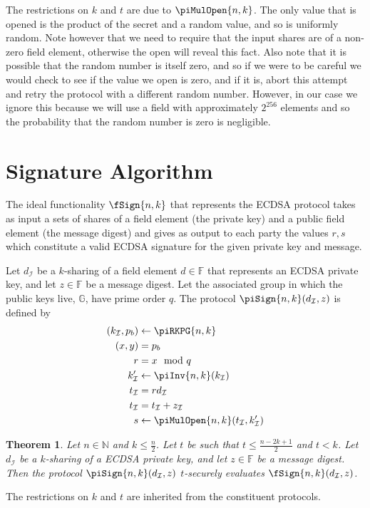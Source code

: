 \documentclass{article}
\newtheorem{theorem}{Theorem}
\theoremstyle{remark}
\newcommand{\N}{\mathbb{N}}
\newcommand{\F}{\mathbb{F}}
\newcommand{\G}{\mathbb{G}}
\begin{document}
The restrictions on $k$ and $t$ are due to $\piMulOpen{n,k}$. The only value
that is opened is the product of the secret and a random value, and so is
uniformly random. Note however that we need to require that the input shares
are of a non-zero field element, otherwise the open will reveal this fact. Also
note that it is possible that the random number is itself zero, and so if we
were to be careful we would check to see if the value we open is zero, and if
it is, abort this attempt and retry the protocol with a different random
number. However, in our case we ignore this because we will use a field with
approximately $2^{256}$ elements and so the probability that the random number
is zero is negligible.

\section{Signature Algorithm}

The ideal functionality $\fSign{n,k}$ that represents the ECDSA protocol takes
as input a sets of shares of a field element (the private key) and a public
field element (the message digest) and gives as output to each party the values
$r, s$ which constitute a valid ECDSA signature for the given private key and
message.

Let $d_\mathcal{I}$ be a $k$-sharing of a field element $d \in \F$ that
represents an ECDSA private key, and let $z \in \F$ be a message digest. Let
the associated group in which the public keys live, $\G$, have prime order $q$.
The protocol $\piSign{n,k}(d_\mathcal{I}, z)$ is defined by
\begin{align*}
	(k_\mathcal{I}, p_b) &\leftarrow \piRKPG{n,k}\\
	(x, y) &= p_b\\
	r &= x \mod q\\
	k'_\mathcal{I} &\leftarrow \piInv{n,k}(k_\mathcal{I})\\
	t_\mathcal{I} &= rd_\mathcal{I}\\
	t_\mathcal{I} &= t_\mathcal{I} + z_\mathcal{I}\\
	s &\leftarrow \piMulOpen{n,k}(t_\mathcal{I}, k'_\mathcal{I})
\end{align*}

\begin{theorem}
	Let $n \in \N$ and $k \le \frac{n}{2}$. Let $t$ be such that $t \le \frac{n
	- 2k + 1}{2}$ and $t < k$. Let $d_\mathcal{I}$ be a $k$-sharing of a ECDSA
	private key, and let $z \in \F$ be a message digest. Then the protocol
	$\piSign{n,k}(d_\mathcal{I}, z)$ $t$-securely evaluates
	$\fSign{n,k}(d_\mathcal{I}, z)$.
\end{theorem}
The restrictions on $k$ and $t$ are inherited from the constituent protocols.
\end{document}
